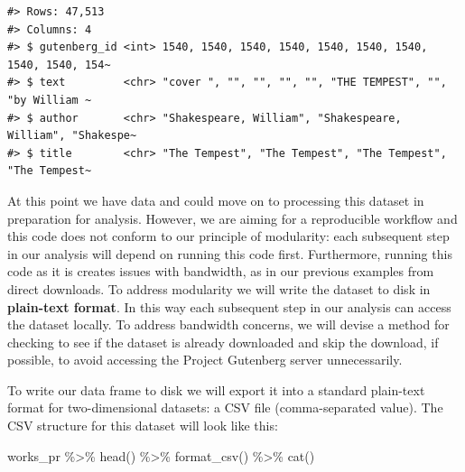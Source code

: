 \documentclass[
  letterpaper,
]{latex/krantz}
\newenvironment{Shaded}{\begin{snugshade}}{\end{snugshade}}
\newcommand{\AttributeTok}[1]{\textcolor[rgb]{0.40,0.45,0.13}{#1}}
\newcommand{\CommentTok}[1]{\textcolor[rgb]{0.37,0.37,0.37}{#1}}
\newcommand{\FunctionTok}[1]{\textcolor[rgb]{0.28,0.35,0.67}{#1}}
\newcommand{\NormalTok}[1]{\textcolor[rgb]{0.00,0.23,0.31}{#1}}
\newcommand{\OtherTok}[1]{\textcolor[rgb]{0.00,0.23,0.31}{#1}}
\newcommand{\SpecialCharTok}[1]{\textcolor[rgb]{0.37,0.37,0.37}{#1}}
\newcommand{\StringTok}[1]{\textcolor[rgb]{0.13,0.47,0.30}{#1}}
\begin{document}
\begin{Shaded}
\end{Shaded}

\begin{verbatim}
#> Rows: 47,513
#> Columns: 4
#> $ gutenberg_id <int> 1540, 1540, 1540, 1540, 1540, 1540, 1540, 1540, 1540, 154~
#> $ text         <chr> "cover ", "", "", "", "", "THE TEMPEST", "", "by William ~
#> $ author       <chr> "Shakespeare, William", "Shakespeare, William", "Shakespe~
#> $ title        <chr> "The Tempest", "The Tempest", "The Tempest", "The Tempest~
\end{verbatim}

At this point we have data and could move on to processing this dataset
in preparation for analysis. However, we are aiming for a reproducible
workflow and this code does not conform to our principle of modularity:
each subsequent step in our analysis will depend on running this code
first. Furthermore, running this code as it is creates issues with
bandwidth, as in our previous examples from direct downloads. To address
modularity we will write the dataset to disk in \textbf{plain-text
format}. In this way each subsequent step in our analysis can access the
dataset locally. To address bandwidth concerns, we will devise a method
for checking to see if the dataset is already downloaded and skip the
download, if possible, to avoid accessing the Project Gutenberg server
unnecessarily.

To write our data frame to disk we will export it into a standard
plain-text format for two-dimensional datasets: a CSV file
(comma-separated value). The CSV structure for this dataset will look
like this:

\begin{Shaded}
\begin{Highlighting}[]
\NormalTok{works\_pr }\SpecialCharTok{\%\textgreater{}\%} \FunctionTok{head}\NormalTok{() }\SpecialCharTok{\%\textgreater{}\%} \FunctionTok{format\_csv}\NormalTok{() }\SpecialCharTok{\%\textgreater{}\%} \FunctionTok{cat}\NormalTok{()}
\end{Highlighting}
\end{Shaded}
\end{document}
